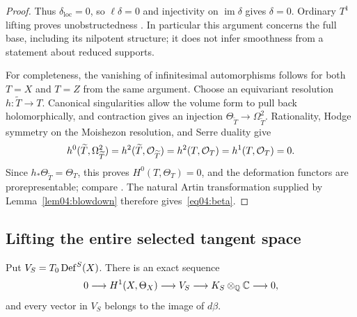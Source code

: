 \begin{proof}
Thus $\delta_{\mathrm{loc}}=0$, so $\ell\delta=0$ and injectivity
on $\operatorname{im}\delta$ gives $\delta=0$.  Ordinary $T^1$
lifting proves unobstructedness
\cite[Theorem~3.3]{friedman2026}.  In particular this argument concerns
the full base, including its nilpotent structure; it does not infer
smoothness from a statement about reduced supports.

For completeness, the vanishing of infinitesimal automorphisms follows
for both $T=X$ and $T=Z$ from the same argument.  Choose an equivariant
resolution $h:\widetilde T\to T$.  Canonical singularities allow the
volume form to pull back holomorphically, and contraction gives an
injection $\Theta_{\widetilde T}\to\Omega^2_{\widetilde T}$.
Rationality, Hodge symmetry on the Moishezon resolution, and Serre
duality give
\[
 h^0(\widetilde T,\Omega^2_{\widetilde T})
 =h^2(\widetilde T,\mathcal{O}_{\widetilde T})
 =h^2(T,\mathcal{O}_T)=h^1(T,\mathcal{O}_T)=0.
\]
Since $h_*\Theta_{\widetilde T}=\Theta_T$, this proves
$H^0(T,\Theta_T)=0$, and the deformation functors are
prorepresentable; compare \cite[Lemma~3.2]{friedman2026}.
The natural Artin transformation supplied by
Lemma~\ref{lem04:blowdown} therefore gives~\eqref{eq04:beta}.
\end{proof}

\subsection{Lifting the entire selected tangent space}

\begin{lemma}\label{lem04:globaltangent}
Put $V_S=T_0\operatorname{Def}^S(X)$.  There is an exact sequence
\begin{equation}\label{eq04:tangent}
 0\longrightarrow H^1(X,\Theta_X)\longrightarrow V_S
       \longrightarrow K_S\otimes_{\mathbb{Q}}\mathbb{C}\longrightarrow0,
\end{equation}
and every vector in $V_S$ belongs to the image of $d\beta$.
\end{lemma}

